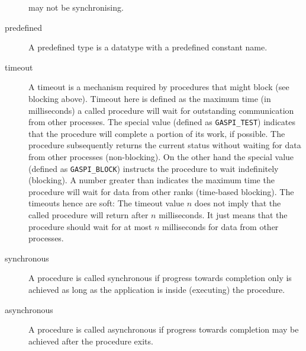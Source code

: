 \documentclass[a4paper]{article}
\newlength{\st}\setlength{\st}{0pt}
\newcommand{\zsep}[1]{#1}
\newcommand{\GASPITEST}{{\tt\protect\zsep{GASPI\_TEST}}}
\newcommand{\GASPIBLOCK}{{\tt\protect\zsep{GASPI\_BLOCK}}}
\begin{document}
\begin{description}
  may not be synchronising.
\item[predefined] A predefined type is a datatype with a predefined
  constant name.
\item[timeout] A timeout is a mechanism required by procedures that
  might block (see blocking above). Timeout here is defined as the
  maximum time (in milliseconds) a called procedure will wait for
  outstanding communication from other processes. The special value
   (defined as \GASPITEST{}) indicates that the procedure
  will complete a portion of its work, if possible. The procedure subsequently
  returns the current status without waiting for data from other
  processes (non-blocking). On the other hand the special value
   (defined as \GASPIBLOCK{}) instructs the procedure to
  wait indefinitely (blocking).  A number greater than 
  indicates the maximum time the procedure will wait for data from
  other ranks (time-based blocking).  The timeouts hence are soft: The
  timeout value $n$ does not imply that the called procedure will
  return after $n$ milliseconds. It just means that the procedure
  should wait for at most $n$ milliseconds for data from other
  processes.
\item[synchronous] A procedure is called synchronous if progress
  towards completion only is achieved as long as the application is
  inside (executing) the procedure.
\begin{center}
\end{center}
\item[asynchronous]
  A procedure is called asynchronous if progress towards
  completion may be achieved after the procedure exits.
\begin{center}
\end{center}

\end{description}
\end{document}
